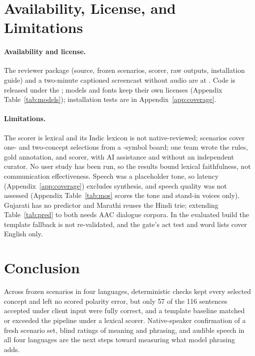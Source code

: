 \section{Availability, License, and Limitations}
\label{sec:limits}

\paragraph{Availability and license.}
The reviewer package (source, frozen scenarios, scorer, raw outputs, installation guide) and a two-minute captioned screencast without audio are at \demourl{}.
Code is released under the \codelicense{}; models and fonts keep their own licenses (Appendix Table~\ref{tab:models}); installation tests are in Appendix~\ref{app:coverage}.

\paragraph{Limitations.}
The scorer is lexical and its Indic lexicon is not native-reviewed; scenarios cover one- and two-concept selections from a \NSymbols{}-symbol board; one team wrote the rules, gold annotation, and scorer, with AI assistance and without an independent curator.
No user study has been run, so the results bound lexical faithfulness, not communication effectiveness.
Speech was a placeholder tone, so latency (Appendix~\ref{app:coverage}) excludes synthesis, and \indicf{} speech quality was not assessed (Appendix Table~\ref{tab:mos} scores the tone and stand-in voices only).
Gujarati has no predictor and Marathi reuses the Hindi trie; extending Table~\ref{tab:pred} to both needs AAC dialogue corpora.
In the evaluated build the template fallback is not re-validated, and the gate's act test and word lists cover English only.

\section{Conclusion}
\label{sec:conclusion}

Across \NPrimAll{} frozen scenarios in four languages, deterministic checks kept every selected concept and left no scored polarity error, but only 57 of the 116 sentences accepted under client input were fully correct, and a template baseline matched or exceeded the pipeline under a lexical scorer.
Native-speaker confirmation of a fresh scenario set, blind ratings of meaning and phrasing, and audible speech in all four languages are the next steps toward measuring what model phrasing adds.
